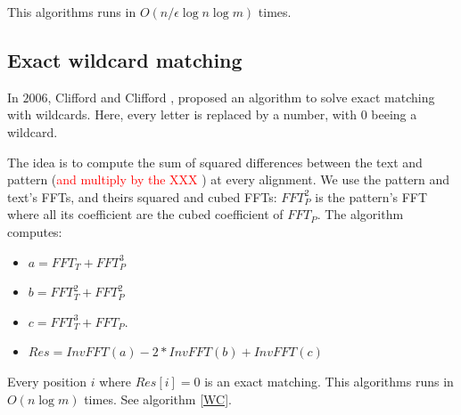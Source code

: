 \documentclass[preprint,12pt]{elsarticle}
\begin{document}
This algorithms runs in $O(n / \epsilon \log n \log m)$ times.








\subsection{Exact wildcard matching}

In $2006$, Clifford and Clifford \cite{WC}, proposed an algorithm to solve
exact matching with wildcards.
Here, every letter is replaced by a number, with $0$ beeing a wildcard.

The idea is to compute the sum of squared differences between the text and pattern
(\textcolor{red}{and multiply by the XXX} ) at every alignment.
We use the pattern and text's FFTs, and theirs squared and cubed FFTs:
$FFT^2_P$ is the pattern's FFT where all its coefficient are the cubed coefficient of $FFT_P$.
The algorithm computes: 
\begin{itemize}
\setlength\itemsep{0.1em}
\item $a = FFT_T+ FFT^3_P$
\item $b = FFT^2_T+ FFT^2_P$
\item $c = FFT^3_T+ FFT_P$.
\item $Res = InvFFT(a) - 2*InvFFT(b) + InvFFT(c)$
\end{itemize}

Every position $i$ where $Res[i] = 0$ is an exact matching.
This algorithms runs in $O(n \log m)$ times. See algorithm \ref{WC}.



\end{document}
